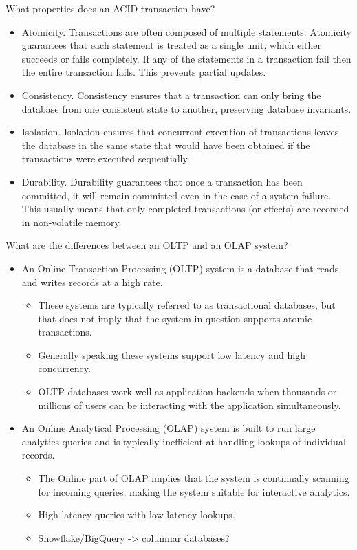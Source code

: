 \begin{questions}
\question What properties does an ACID transaction have?
\begin{solution}
\begin{itemize}
    \item Atomicity. Transactions are often composed of multiple statements. Atomicity guarantees that each statement is treated as a single unit, which either succeeds or fails completely. If any of the statements in a transaction fail then the entire transaction fails. This prevents partial updates.
    \item Consistency. Consistency ensures that a transaction can only bring the database from one consistent state to another, preserving database invariants.
    \item Isolation. Isolation ensures that concurrent execution of transactions leaves the database in the same state that would have been obtained if the transactions were executed sequentially.
    \item Durability. Durability guarantees that once a transaction has been committed, it will remain committed even in the case of a system failure. This usually means that only completed transactions (or effects) are recorded in non-volatile memory.
\end{itemize}
\end{solution}

\question What are the differences between an OLTP and an OLAP system?
\begin{solution}
\begin{itemize}
    \item An Online Transaction Processing (OLTP) system is a database that reads and writes records at a high rate.
    \begin{itemize}
        \item These systems are typically referred to as transactional databases, but that does not imply that the system in question supports atomic transactions.
        \item Generally speaking these systems support low latency and high concurrency.
        \item OLTP databases work well as application backends when thousands or millions of users can be interacting with the application simultaneously.
    \end{itemize}
    \item An Online Analytical Processing (OLAP) system is built to run large analytics queries and is typically inefficient at handling lookups of individual records.
    \begin{itemize}
        \item The Online part of OLAP implies that the system is continually scanning for incoming queries, making the system suitable for interactive analytics.
        \item High latency queries with low latency lookups.
        \item Snowflake/BigQuery -> columnar databases?
    \end{itemize}
\end{itemize}   
\end{solution}


\end{questions}
